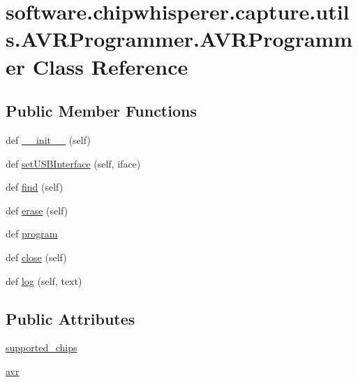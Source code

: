 \hypertarget{classsoftware_1_1chipwhisperer_1_1capture_1_1utils_1_1AVRProgrammer_1_1AVRProgrammer}{}\section{software.\+chipwhisperer.\+capture.\+utils.\+A\+V\+R\+Programmer.\+A\+V\+R\+Programmer Class Reference}
\label{classsoftware_1_1chipwhisperer_1_1capture_1_1utils_1_1AVRProgrammer_1_1AVRProgrammer}
\subsection*{Public Member Functions}
\begin{DoxyCompactItemize}
\item 
def \hyperlink{classsoftware_1_1chipwhisperer_1_1capture_1_1utils_1_1AVRProgrammer_1_1AVRProgrammer_a6810736dc7b2ac8b86a2f221369ea3c3}{\+\_\+\+\_\+init\+\_\+\+\_\+} (self)
\item 
def \hyperlink{classsoftware_1_1chipwhisperer_1_1capture_1_1utils_1_1AVRProgrammer_1_1AVRProgrammer_a2c593dea6785550ebe3d1ff0d52880ba}{set\+U\+S\+B\+Interface} (self, iface)
\item 
def \hyperlink{classsoftware_1_1chipwhisperer_1_1capture_1_1utils_1_1AVRProgrammer_1_1AVRProgrammer_a3bc4fa81c9c2bcf46f18bc575ced1c25}{find} (self)
\item 
def \hyperlink{classsoftware_1_1chipwhisperer_1_1capture_1_1utils_1_1AVRProgrammer_1_1AVRProgrammer_ab1acfa8af5e6c21d2469fedd3c173b19}{erase} (self)
\item 
def \hyperlink{classsoftware_1_1chipwhisperer_1_1capture_1_1utils_1_1AVRProgrammer_1_1AVRProgrammer_a25d8312d5924393f00d2c18a05fd7b4c}{program}
\item 
def \hyperlink{classsoftware_1_1chipwhisperer_1_1capture_1_1utils_1_1AVRProgrammer_1_1AVRProgrammer_a5554196357a8f53ad0646a8f5949ef4c}{close} (self)
\item 
def \hyperlink{classsoftware_1_1chipwhisperer_1_1capture_1_1utils_1_1AVRProgrammer_1_1AVRProgrammer_a1ef8f9d5cf8b2c1257c0d5a3d277d01f}{log} (self, text)
\end{DoxyCompactItemize}
\subsection*{Public Attributes}
\begin{DoxyCompactItemize}
\item 
\hyperlink{classsoftware_1_1chipwhisperer_1_1capture_1_1utils_1_1AVRProgrammer_1_1AVRProgrammer_a26128a56c0884b06659f8fc94bbbc010}{supported\+\_\+chips}
\item 
\hyperlink{classsoftware_1_1chipwhisperer_1_1capture_1_1utils_1_1AVRProgrammer_1_1AVRProgrammer_a23fd93fb1fb7c6ef9b6bae8605ca1d75}{avr}
\end{DoxyCompactItemize}


